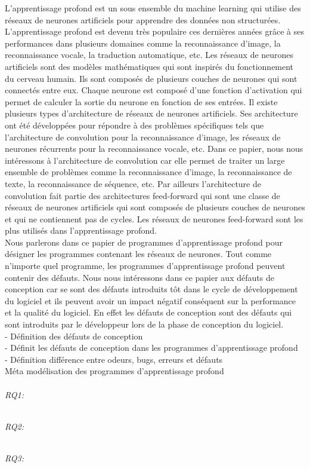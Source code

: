 \label{sec:introduction}

L'apprentissage profond est un sous ensemble du machine learning qui utilise des
réseaux de neurones artificiels pour apprendre des données non structurées.
L'apprentissage profond est devenu très populaire ces dernières années grâce à
ses performances dans plusieurs domaines comme la reconnaissance d'image, la
reconnaissance vocale, la traduction automatique, etc. Les réseaux de neurones
artificiels sont des modèles mathématiques qui sont inspirés du fonctionnement
du cerveau humain. Ils sont composés de plusieurs couches de neurones qui sont
connectés entre eux. Chaque neurone est composé d'une fonction d'activation qui
permet de calculer la sortie du neurone en fonction de ses entrées. Il existe
plusieurs types d'architecture de réseaux de neurones artificiels. Ses
architecture ont été développées pour répondre à des problèmes spécifiques tels
que l'architecture de convolution pour la reconnaissance d'image, les réseaux de
neurones récurrents pour la reconnaissance vocale, etc. Dans ce papier, nous
nous intéressons à l'architecture de convolution car elle permet de traiter un
large ensemble de problèmes comme la reconnaissance d'image, la reconnaissance
de texte, la reconnaissance de séquence, etc. Par ailleurs l'architecture de
convolution fait partie des architectures feed-forward qui sont une classe de
réseaux de neurones artificiels qui sont composés de plusieurs couches de
neurones  et qui ne contiennent pas de cycles. Les réseaux de neurones
feed-forward sont les plus utilisés dans l'apprentissage profond.\\

Nous parlerons dans ce papier de programmes d'apprentissage profond pour
désigner les programmes contenant les réseaux de neurones. Tout comme n'importe quel programme, les programmes d'apprentissage profond peuvent contenir des défauts.
Nous nous intéressons dans ce papier aux défauts de conception car se sont des
défauts introduits tôt dans le cycle de développement du logiciel et ils peuvent
avoir un impact négatif conséquent sur la performance et la qualité du logiciel. En effet les défauts de
conception sont des défauts qui sont introduits par le développeur lors de la
phase de  conception du logiciel.\\


- Définition des défauts de conception\\
- Définit les défauts de conception dans les programmes d'apprentissage
profond\\
- Définition différence entre odeurs, bugs, erreurs et défauts\\


Méta modélisation des programmes d'apprentissage profond\\



\emph{\\RQ1:\RQOne} %

\emph{\\RQ2:\RQTwo} %

\emph{\\RQ3:\RQThree} %


